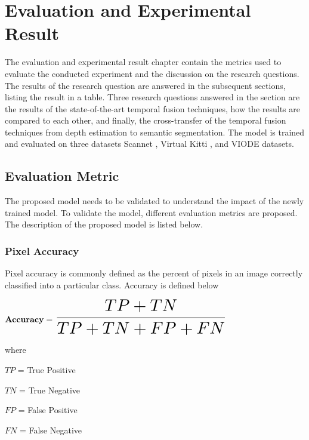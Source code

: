
\newcommand\scalemath[2]{\scalebox{#1}{\mbox{\ensuremath{\displaystyle #2}}}}



    \chapter{Evaluation and Experimental Result}
	\label{chap:evaluationandresult}
    The evaluation and experimental result chapter contain the metrics used to evaluate the conducted experiment and the discussion on the research questions. The results of the research question are answered in the subsequent sections, listing the result in a table. Three research questions answered in the section are the results of the state-of-the-art temporal fusion techniques, how the results are compared to each other, and finally, the cross-transfer of the temporal fusion techniques from depth estimation to semantic segmentation. The model is trained and evaluated on three datasets Scannet \cite{79_dai2017scannet}, Virtual Kitti \cite{80_cabon2020vkitti2}, and VIODE \cite{81_minodaRAL2021} datasets. 
    
    \section{Evaluation Metric}
    
    The proposed model needs to be validated to understand the impact of the newly trained model. To validate the model, different evaluation metrics are proposed. The description of the proposed model is listed below.
    
    \subsection{Pixel Accuracy}
    
    Pixel accuracy is commonly defined as the percent of pixels in an image correctly classified into a particular class. Accuracy is defined below
    
    $
    {\bf Accuracy } = \scalemath{2}{\frac{TP+TN}{TP+TN+FP+FN}}
    $
    
    where
     
    $TP$ = True Positive 
    
    $TN$ = True Negative
    
    $FP$ = False Positive
    
    $FN$ = False Negative
    
